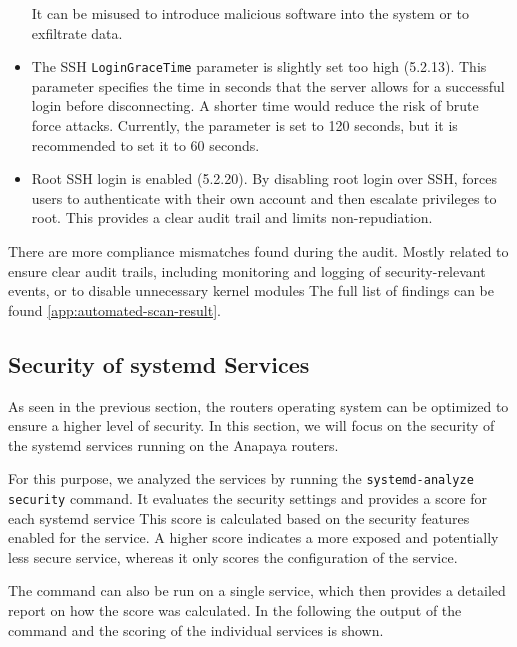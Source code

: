 \begin{itemize}
    It can be misused to introduce malicious software into the system or to exfiltrate data.
    \item The SSH \texttt{LoginGraceTime} parameter is slightly set too high (5.2.13).
    This parameter specifies the time in seconds that the server allows for a successful login before disconnecting.
    A shorter time would reduce the risk of brute force attacks.
    Currently, the parameter is set to 120 seconds, but it is recommended to set it to 60 seconds.
    \item Root SSH login is enabled (5.2.20).
    By disabling root login over SSH, forces users to authenticate with their own account and then escalate privileges to root.
    This provides a clear audit trail and limits non-repudiation.
\end{itemize}


There are more compliance mismatches found during the audit.
Mostly related to ensure clear audit trails, including monitoring and logging of security-relevant events, or to disable unnecessary kernel modules
The full list of findings can be found \cref{app:automated-scan-result}.

\subsection{Security of systemd Services}
As seen in the previous section, the routers operating system can be optimized to ensure a higher level of security.
In this section, we will focus on the security of the systemd services running on the Anapaya routers.

For this purpose, we analyzed the services by running the \texttt{systemd-analyze security} command.
It evaluates the security settings and provides a score for each systemd service
This score is calculated based on the security features enabled for the service.
A higher score indicates a more exposed and potentially less secure service, whereas it only scores the configuration of the service.

The command can also be run on a single service, which then provides a detailed report on how the score was calculated.
In the following the output of the command and the scoring of the individual services is shown.



